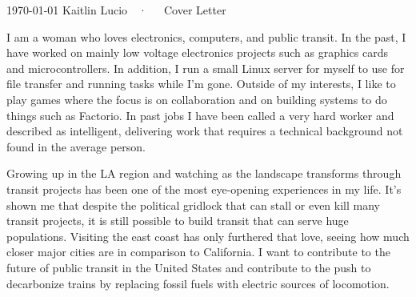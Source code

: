 \documentclass[11pt, a4paper]{awesome-cv}
\begin{document}
\makecvheader[R]

\makecvfooter
  {\today}
  {Kaitlin Lucio~~·~~~Cover Letter}
  {}

\makelettertitle

\begin{cvletter}

I am a woman who loves electronics, computers, and public transit. In the past, I have worked on mainly low voltage electronics projects such as graphics cards and microcontrollers. In addition, I run a small Linux server for myself to use for file transfer and running tasks while I'm gone. Outside of my interests, I like to play games where the focus is on collaboration and on building systems to do things such as Factorio. In past jobs I have been called a very hard worker and described as intelligent, delivering work that requires a technical background not found in the average person.

Growing up in the LA region and watching as the landscape transforms through transit projects has been one of the most eye-opening experiences in my life. It's shown me that despite the political gridlock that can stall or even kill many transit projects, it is still possible to build transit that can serve huge populations. Visiting the east coast has only furthered that love, seeing how much closer major cities are in comparison to California. I want to contribute to the future of public transit in the United States and contribute to the push to decarbonize trains by replacing fossil fuels with electric sources of locomotion.

\end{cvletter}


\makeletterclosing
\end{document}
